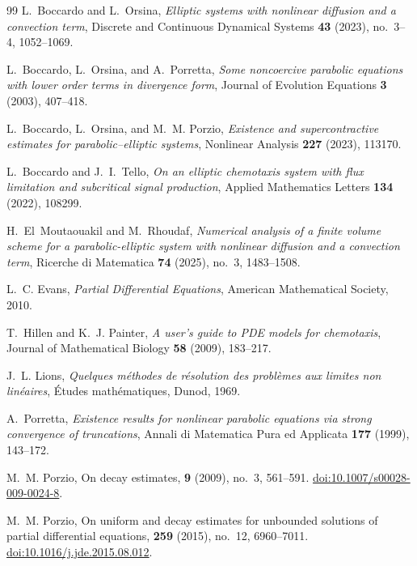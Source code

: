 \documentclass{amsart}
\numberwithin{equation}{section}
\begin{document}
\begin{thebibliography}{99}
L.~Boccardo and L.~Orsina, \emph{Elliptic systems with nonlinear diffusion and a convection term}, Discrete and Continuous Dynamical Systems \textbf{43} (2023), no.~3--4, 1052--1069.

L.~Boccardo, L.~Orsina, and A.~Porretta, \emph{Some noncoercive parabolic equations with lower order terms in divergence form}, Journal of Evolution Equations \textbf{3} (2003), 407--418.

L.~Boccardo, L.~Orsina, and M.~M. Porzio, \emph{Existence and supercontractive estimates for parabolic--elliptic systems}, Nonlinear Analysis \textbf{227} (2023), 113170.

L.~Boccardo and J.~I.~Tello, \emph{On an elliptic chemotaxis system with flux limitation and subcritical signal production}, Applied Mathematics Letters \textbf{134} (2022), 108299.

H.~El~Moutaouakil and M.~Rhoudaf, \emph{Numerical analysis of a finite volume scheme for a parabolic-elliptic system with nonlinear diffusion and a convection term}, Ricerche di Matematica \textbf{74} (2025), no.~3, 1483--1508.

L.~C. Evans, \emph{Partial Differential Equations}, American Mathematical Society, 2010.

T.~Hillen and K.~J. Painter, \emph{A user's guide to PDE models for chemotaxis}, Journal of Mathematical Biology \textbf{58} (2009), 183--217.

J.~L. Lions, \emph{Quelques m\'ethodes de r\'esolution des probl\`emes aux limites non lin\'eaires}, \'Etudes math\'ematiques, Dunod, 1969.

A.~Porretta, \emph{Existence results for nonlinear parabolic equations via strong convergence of truncations}, Annali di Matematica Pura ed Applicata \textbf{177} (1999), 143--172.

M.~M. Porzio,
\newblock On decay estimates,
 \textbf{9} (2009), no.~3, 561--591.
\newblock \href{https://doi.org/10.1007/s00028-009-0024-8}{doi:10.1007/s00028-009-0024-8}.

M.~M. Porzio,
\newblock On uniform and decay estimates for unbounded solutions of partial differential equations,
 \textbf{259} (2015), no.~12, 6960--7011.
\newblock \href{https://doi.org/10.1016/j.jde.2015.08.012}{doi:10.1016/j.jde.2015.08.012}.


\end{thebibliography}
\end{document}

